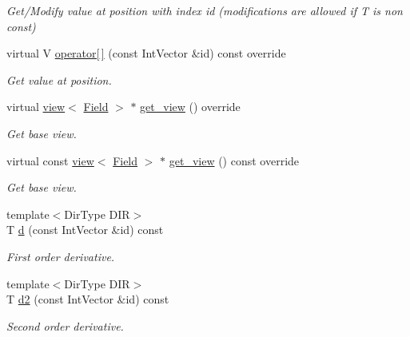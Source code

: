 \begin{DoxyCompactItemize}
\begin{DoxyCompactList}\small\item\em Get/\+Modify value at position with index id (modifications are allowed if T is non const) \end{DoxyCompactList}\item 
virtual V \hyperlink{classUintah_1_1PhaseField_1_1detail_1_1dw__fd_3_01ScalarField_3_01T_01_4_00_01STN_00_01VAR_00_011_01_4_af88147d0e6c0b18e7e90b04d5a5db313}{operator\mbox{[}$\,$\mbox{]}} (const Int\+Vector \&id) const override
\begin{DoxyCompactList}\small\item\em Get value at position. \end{DoxyCompactList}\item 
virtual \hyperlink{classUintah_1_1PhaseField_1_1detail_1_1view}{view}$<$ \hyperlink{structUintah_1_1PhaseField_1_1ScalarField}{Field} $>$ $\ast$ \hyperlink{classUintah_1_1PhaseField_1_1detail_1_1dw__fd_3_01ScalarField_3_01T_01_4_00_01STN_00_01VAR_00_011_01_4_a6c8bfba52568211434dbb756fe44b6be}{get\+\_\+view} () override
\begin{DoxyCompactList}\small\item\em Get base view. \end{DoxyCompactList}\item 
virtual const \hyperlink{classUintah_1_1PhaseField_1_1detail_1_1view}{view}$<$ \hyperlink{structUintah_1_1PhaseField_1_1ScalarField}{Field} $>$ $\ast$ \hyperlink{classUintah_1_1PhaseField_1_1detail_1_1dw__fd_3_01ScalarField_3_01T_01_4_00_01STN_00_01VAR_00_011_01_4_a4f93fef2b9ee7daaff2707f59dc6ac17}{get\+\_\+view} () const override
\begin{DoxyCompactList}\small\item\em Get base view. \end{DoxyCompactList}\item 
{\footnotesize template$<$Dir\+Type D\+IR$>$ }\\T \hyperlink{classUintah_1_1PhaseField_1_1detail_1_1dw__fd_3_01ScalarField_3_01T_01_4_00_01STN_00_01VAR_00_011_01_4_a26fc84c003985def3cc58fdd08e68759}{d} (const Int\+Vector \&id) const
\begin{DoxyCompactList}\small\item\em First order derivative. \end{DoxyCompactList}\item 
{\footnotesize template$<$Dir\+Type D\+IR$>$ }\\T \hyperlink{classUintah_1_1PhaseField_1_1detail_1_1dw__fd_3_01ScalarField_3_01T_01_4_00_01STN_00_01VAR_00_011_01_4_a0f3866f3affecf6243d5474585783d13}{d2} (const Int\+Vector \&id) const
\begin{DoxyCompactList}\small\item\em Second order derivative. \end{DoxyCompactList}\end{DoxyCompactItemize}
